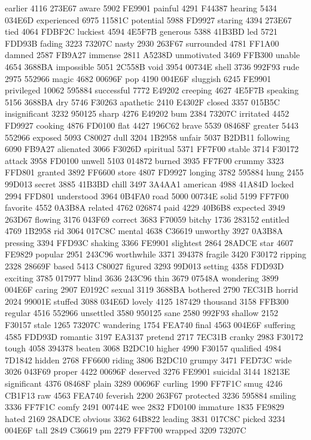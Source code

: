 earlier 4116 273E67 aware 5902 FE9901 painful 4291 F44387 hearing 5434
034E6D experienced 6975 11581C potential 5988 FD9927 staring 4394
273E67 tied 4064 FDBF2C luckiest 4594 4E5F7B generous 5388 41B3BD led
5721 FDD93B fading 3223 73207C nasty 2930 263F67 surrounded 4781 FF1A00
damned 2587 FB9A27 immense 2811 A5238D unmotivated 3469 FFB300 unable
4654 3688BA impossible 5051 2C558B void 3954 00734E shell 3736 992F93
rude 2975 552966 magic 4682 00696F pop 4190 004E6F sluggish 6245 FE9901
privileged 10062 595884 successful 7772 E49202 creeping 4627 4E5F7B
speaking 5156 3688BA dry 5746 F30263 apathetic 2410 E4302F closed 3357
015B5C insignificant 3232 950125 sharp 4276 E49202 bum 2384 73207C
irritated 4452 FD9927 cooking 4876 FD0100 flat 4427 196C62 brave 5539
08468F greater 5443 552966 exposed 5093 C80027 dull 3204 1B2958 unfair
5037 B2DB11 following 6090 FB9A27 alienated 3066 F3026D spiritual 5371
FF7F00 stable 3714 F30172 attack 3958 FD0100 unwell 5103 014872 burned
3935 FF7F00 crummy 3323 FFD801 granted 3892 FF6600 store 4807 FD9927
longing 3782 595884 hung 2455 99D013 secret 3885 41B3BD chill 3497
3A4AA1 american 4988 41A84D locked 2994 FFD801 understood 3964 0B4FA0
road 5000 00734E solid 5199 FF7F00 favorite 4552 0A3B8A related 4762
026874 paid 4229 40B6B8 expected 3949 263D67 flowing 3176 043F69
correct 3683 F70059 bitchy 1736 283152 entitled 4769 1B2958 rid 3064
017C8C mental 4638 C36619 unworthy 3927 0A3B8A pressing 3394 FFD93C
shaking 3366 FE9901 slightest 2864 28ADCE star 4607 FE9829 popular 2951
243C96 worthwhile 3371 394378 fragile 3420 F30172 ripping 2328 28669F
based 5413 C80027 figured 3293 99D013 setting 4358 FDD93D exciting 3785
017977 blind 3636 243C96 thin 3679 07548A wondering 3899 004E6F caring
2907 E0192C sexual 3119 3688BA bothered 2790 7EC31B horrid 2024 99001E
stuffed 3088 034E6D lovely 4125 187429 thousand 3158 FFB300 regular
4516 552966 unsettled 3580 950125 sane 2580 992F93 shallow 2152 F30157
stale 1265 73207C wandering 1754 FEA740 final 4563 004E6F suffering
4585 FDD93D romantic 3197 EA3137 pretend 2717 7EC31B cranky 2983 F30172
tough 4058 394378 beaten 3068 B2DC10 higher 4990 F30157 qualified 4984
7D1842 hidden 2768 FF6600 riding 3806 B2DC10 grumpy 3471 FED73C wide
3026 043F69 proper 4422 00696F deserved 3276 FE9901 suicidal 3144
18213E significant 4376 08468F plain 3289 00696F curling 1990 FF7F1C
smug 4246 CB1F13 raw 4563 FEA740 feverish 2200 263F67 protected 3236
595884 smiling 3336 FF7F1C comfy 2491 00744E wee 2832 FD0100 immature
1835 FE9829 hated 2169 28ADCE obvious 3362 64B822 leading 3831 017C8C
picked 3234 004E6F tall 2849 C36619 pm 2279 FFF700 wrapped 3209 73207C
